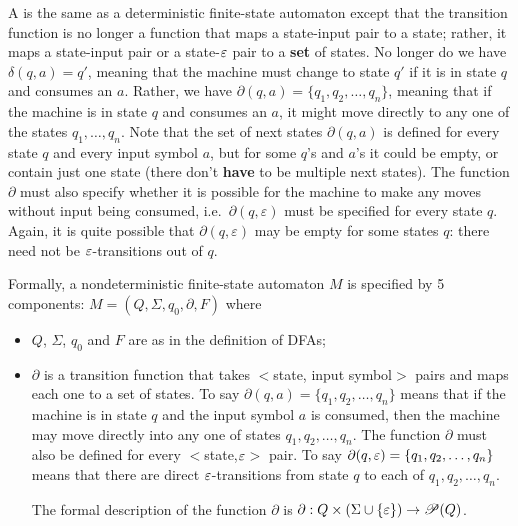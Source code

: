 \smallskip

A  is the same as a 
deterministic
finite-state automaton except that the transition function is no longer a
function that maps a state-input pair to a state; rather, it maps a state-input
pair or a state-$\varepsilon$ pair to a {\bf set} of states.  No longer do we have 
$\delta(q,a) = q'$, meaning that the machine
must change to state $q'$ if it is in state $q$ and consumes an $a$.  Rather,
we have $\partial(q,a) = \{q_1, q_2, \ldots, q_n\}$, meaning that if the
machine is in state $q$ and consumes an $a$, it might move directly to any one
of the states $q_1, \ldots, q_n$.  Note that the set of next states
$\partial(q,a)$ is defined for every state $q$ and every input symbol $a$,
but for some $q$'s and $a$'s it could be empty, or contain just one state (there
don't {\bf have} to be multiple next states).  The function $\partial$ must
also specify whether it is possible for the machine to make any moves 
without input being consumed, i.e.\ $\partial(q, \varepsilon)$ must be
specified for every state $q$.  Again, it is quite possible that 
$\partial(q, \varepsilon)$ may be empty for some states $q$: there need not be
$\varepsilon$-transitions out of $q$.

\smallskip

\begin{definition}
Formally,
a nondeterministic finite-state automaton $M$ is specified by 5 components:
$M=(Q, \Sigma, q_0, \partial, F)$ where
\begin{itemize} 
\item  $Q$, $\Sigma$, $q_0 $ and $F$ are as in the definition of DFAs;
\item $\partial$ is a transition function that takes 
$<$state, input symbol$>$ pairs and maps each one to a set of states.  To say
$\partial(q,a) = \{q_1, q_2, \ldots , q_n\}$ means that
if the machine is in state $q$ and the input symbol $a$ is consumed, then the
machine may move directly into any one of states $q_1, q_2, \ldots , q_n$.  
The function $\partial$ must also be defined for every $<$state,$\varepsilon$$>$ pair.
To say
$\partial(q,\varepsilon) = \{q_1, q_2, \ldots , q_n\}$ means that there are direct
$\varepsilon$-transitions from state $q$ to each of  $q_1, q_2, \ldots , q_n$.


The formal description of the function $\partial$ is $\partial : Q \times
(\Sigma \cup \{\varepsilon\}) \rightarrow {\mathscr P}(Q)$.
\end{itemize}
\end{definition}


